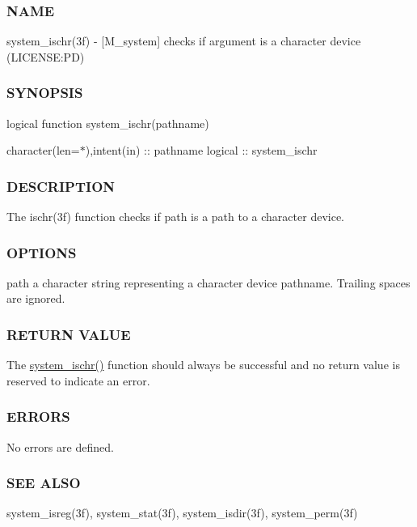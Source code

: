 \subsubsection*{N\+A\+ME}

system\+\_\+ischr(3f) -\/ \mbox{[}M\+\_\+system\mbox{]} checks if argument is a character device (L\+I\+C\+E\+N\+SE\+:PD) 

\subsubsection*{S\+Y\+N\+O\+P\+S\+IS}

logical function system\+\_\+ischr(pathname)

character(len=$\ast$),intent(in) \+:\+: pathname logical \+:\+: system\+\_\+ischr

\subsubsection*{D\+E\+S\+C\+R\+I\+P\+T\+I\+ON}

The ischr(3f) function checks if path is a path to a character device.

\subsubsection*{O\+P\+T\+I\+O\+NS}

path a character string representing a character device pathname. Trailing spaces are ignored.

\subsubsection*{R\+E\+T\+U\+RN V\+A\+L\+UE}

The \mbox{\hyperlink{namespacem__system_a12a948fa4aacda084a538ae3a5ae3cc6}{system\+\_\+ischr()}} function should always be successful and no return value is reserved to indicate an error.

\subsubsection*{E\+R\+R\+O\+RS}

No errors are defined.

\subsubsection*{S\+EE A\+L\+SO}

system\+\_\+isreg(3f), system\+\_\+stat(3f), system\+\_\+isdir(3f), system\+\_\+perm(3f)

